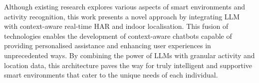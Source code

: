 Although existing research explores various aspects of smart environments and activity recognition, this work presents a novel approach by integrating LLM with context-aware real-time HAR and indoor localisation. This fusion of technologies enables the development of context-aware chatbots capable of providing personalised assistance and enhancing user experiences in unprecedented ways. By combining the power of LLMs with granular activity and location data, this architecture paves the way for truly intelligent and supportive smart environments that cater to the unique needs of each individual.